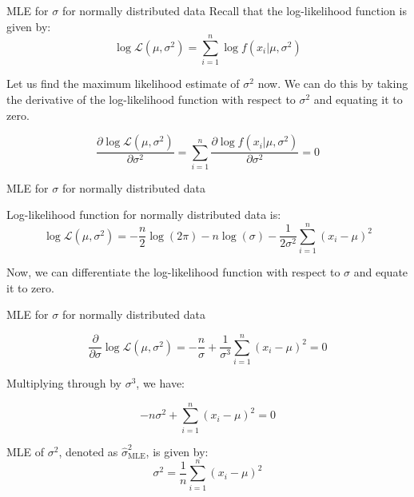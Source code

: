 \documentclass[handout]{beamer}
\begin{document}
\begin{frame}{MLE for $\sigma$ for normally distributed data}
    Recall that the log-likelihood function is given by:
    \begin{equation}
        \log \mathcal{L}(\mu, \sigma^2) = \sum_{i=1}^n \log f(x_i|\mu, \sigma^2)
    \end{equation}

    Let us find the maximum likelihood estimate of $\sigma^2$ now. We can do this by taking the derivative of the log-likelihood function with respect to $\sigma^2$ and equating it to zero.   

    \begin{equation}
        \frac{\partial \log \mathcal{L}(\mu, \sigma^2)}{\partial \sigma^2} = \sum_{i=1}^n \frac{\partial \log f(x_i|\mu, \sigma^2)}{\partial \sigma^2} = 0
    \end{equation}
    
\end{frame}

\begin{frame}{MLE for $\sigma$ for normally distributed data}
    \begin{tcolorbox}[colback=metropolisblue!5,colframe=metropolisblue,title=Log Likelihood Function for Univariate Normal Distribution]
        Log-likelihood function for normally distributed data is:
        \[
            \log \mathcal{L}(\mu, \sigma^2) = -\frac{n}{2} \log(2\pi) - n\log(\sigma) - \frac{1}{2\sigma^2} \sum_{i=1}^n (x_i-\mu)^2
            \]
    \end{tcolorbox}

Now, we can differentiate the log-likelihood function with respect to $\sigma$ and equate it to zero.
\end{frame}

\begin{frame}{MLE for $\sigma$ for normally distributed data}

    
        \[
        \frac{{\partial}}{{\partial \sigma}} \log \mathcal{L}(\mu, \sigma^2) = -\frac{n}{\sigma} + \frac{1}{\sigma^3} \sum_{i=1}^n (x_i-\mu)^2 = 0
        \]
    
        Multiplying through by $\sigma^3$, we have:
    
        \[
        -n \sigma^2 + \sum_{i=1}^n (x_i-\mu)^2 = 0
        \]
    
        \begin{tcolorbox}[colback=metropolisblue!5,colframe=metropolisblue,title=Maximum Likelihood Estimate for $\sigma^2$]
            MLE of $\sigma^2$, denoted as $\hat{\sigma}^2_{\text{MLE}}$, is given by:
            \[
                \sigma^2 = \frac{1}{n} \sum_{i=1}^n (x_i-\mu)^2
                \]
        \end{tcolorbox}
    
       

    \end{frame}
    
\end{document}
